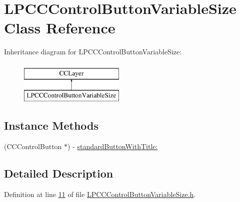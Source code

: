 \hypertarget{interface_l_p_c_c_control_button_variable_size}{\section{L\-P\-C\-C\-Control\-Button\-Variable\-Size Class Reference}
\label{d7/d50/interface_l_p_c_c_control_button_variable_size}
}
Inheritance diagram for L\-P\-C\-C\-Control\-Button\-Variable\-Size\-:\begin{figure}[H]
\begin{center}
\leavevmode
\includegraphics[height=2.000000cm]{d7/d50/interface_l_p_c_c_control_button_variable_size}
\end{center}
\end{figure}
\subsection*{Instance Methods}
\begin{DoxyCompactItemize}
\item 
(C\-C\-Control\-Button $\ast$) -\/ \hyperlink{interface_l_p_c_c_control_button_variable_size_acd2df17edaf3d7dbd80e283a7ee35c52}{standard\-Button\-With\-Title\-:}
\end{DoxyCompactItemize}


\subsection{Detailed Description}


Definition at line \hyperlink{_l_p_c_c_control_button_variable_size_8h_source_l00011}{11} of file \hyperlink{_l_p_c_c_control_button_variable_size_8h_source}{L\-P\-C\-C\-Control\-Button\-Variable\-Size.\-h}.



